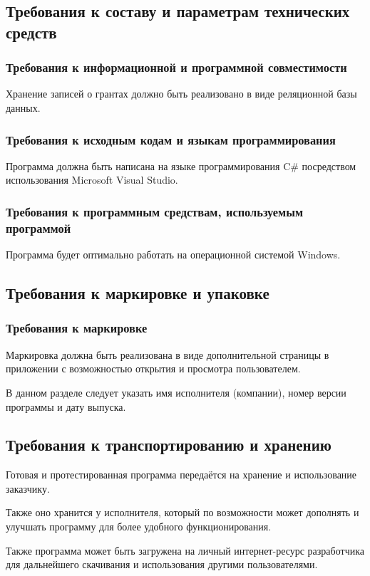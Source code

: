 \documentclass[14pt]{extarticle}
\begin{document}
\subsection {Требования к составу и параметрам технических средств}
\subsubsection {Требования к информационной и программной совместимости}
Хранение записей о грантах должно быть реализовано в виде реляционной базы данных.
\subsubsection {Требования к исходным кодам и языкам программирования}
Программа должна быть написана на языке программирования C#  посредством использования  Microsoft Visual Studio.

\subsubsection {Требования к программным средствам, используемым программой}
Программа будет оптимально работать на операционной системой Windows.

\subsection {Требования к маркировке и упаковке}
\subsubsection {Требования к маркировке}
Маркировка должна быть реализована в виде дополнительной страницы в приложении с возможностью открытия и просмотра пользователем. 
\par В данном разделе следует указать имя исполнителя (компании), номер версии программы и дату выпуска.

\subsection {Требования к транспортированию и хранению}
Готовая и протестированная программа передаётся на хранение и использование заказчику. 
\par Также оно хранится у исполнителя, который по возможности может дополнять и улучшать программу для более удобного функционирования.
\par Также программа может быть загружена на личный интернет-ресурс разработчика для дальнейшего скачивания и использования другими пользователями.
\end{document}
